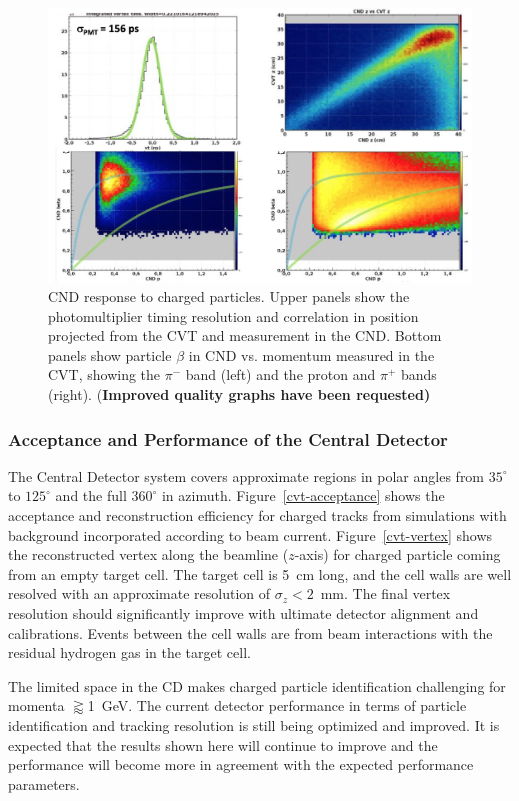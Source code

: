 \documentclass[final,3p,twocolumn]{elsarticle}
\begin{document}
\begin{figure}[htbp!]
\centerline{\includegraphics[width=1.0\columnwidth]{cnd-performance.png}}
\caption{CND response to charged particles. Upper panels show the photomultiplier timing resolution and correlation in position
projected from the CVT and measurement in the CND. Bottom panels show particle $\beta$ in CND vs. momentum
measured in the CVT, showing the $\pi^-$ band (left) and the proton and $\pi^+$ bands (right). 
({\bf Improved quality graphs have been requested)}}
\label{cnd-performance}
\end{figure}

\subsubsection{Acceptance and Performance of the Central Detector} 

The Central Detector system covers approximate regions in polar angles from $35^\circ$ to $125^\circ$ and the
full $360^\circ$ in azimuth.  Figure~\ref{cvt-acceptance} shows the acceptance and reconstruction efficiency for
charged tracks from simulations with background incorporated according to beam current. Figure~\ref{cvt-vertex} 
shows the reconstructed vertex along the beamline ($z$-axis) for charged particle coming from an empty 
target cell. The target cell is 5~cm long, and the cell walls are well resolved with an approximate resolution 
of $\sigma_z<2$~mm. The final vertex resolution should significantly improve with ultimate detector alignment and 
calibrations. Events between the cell walls are from beam interactions with the residual hydrogen gas in the target
cell.  

The limited space in the CD makes charged particle identification challenging for momenta $\gtrapprox$1~GeV.
The current detector performance in terms of particle identification and tracking resolution is still being optimized
and improved. It is expected that the results shown here will continue to improve and the performance will become
more in agreement with the expected performance parameters.
\end{document}
